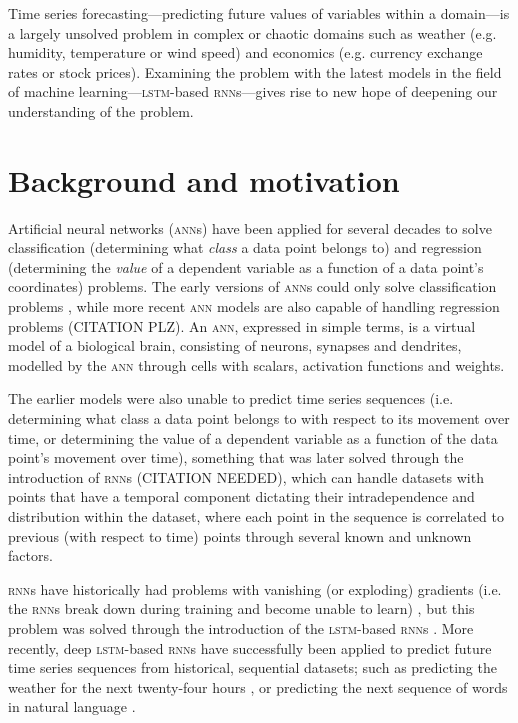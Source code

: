 Time series forecasting---predicting future values of variables within a
domain---is a largely unsolved problem in complex or chaotic domains such as
weather (e.g. humidity, temperature or wind speed) and economics (e.g. currency
exchange rates or stock prices).  Examining the problem with the latest models
in the field of machine learning---\textsc{lstm}-based \textsc{rnn}s---gives
rise to new hope of deepening our understanding of the problem.

\section{Background and motivation}
Artificial neural networks (\textsc{ann}s) have been applied for several decades
to solve classification (determining what \textit{class} a data point belongs
to) and regression (determining the \textit{value} of a dependent variable as a
function of a data point's coordinates) problems.  The early versions of
\textsc{ann}s could only solve classification problems \citep{rosenblatt1958},
while more recent \textsc{ann} models are also capable of handling regression
problems (CITATION PLZ).  An \textsc{ann}, expressed in simple terms, is a
virtual model of a biological brain, consisting of neurons, synapses and
dendrites, modelled by the \textsc{ann} through cells with scalars, activation
functions and weights.

The earlier models were also unable to predict time series sequences (i.e.
determining what class a data point belongs to with respect to its movement over
time, or determining the value of a dependent variable as a function of the data
point's movement over time), something that was later solved through the
introduction of \textsc{rnn}s (CITATION NEEDED), which can handle datasets with
points that have a temporal component dictating their intradependence and
distribution within the dataset, where each point in the sequence is correlated
to previous (with respect to time) points through several known and unknown
factors.

\textsc{rnn}s have historically had problems with vanishing (or exploding)
gradients (i.e. the \textsc{rnn}s break down during training and become unable
to learn) \citep{pascanu2012}, but this problem was solved through the
introduction of the \textsc{lstm}-based \textsc{rnn}s \citep*{hochreiter1997}.
More recently, deep \textsc{lstm}-based \textsc{rnn}s have successfully been
applied to predict future time series sequences from historical, sequential
datasets; such as predicting the weather for the next twenty-four hours
\citep*{zaytar2016}, or predicting the next sequence of words in natural
language \citep*{quoc2014}.

